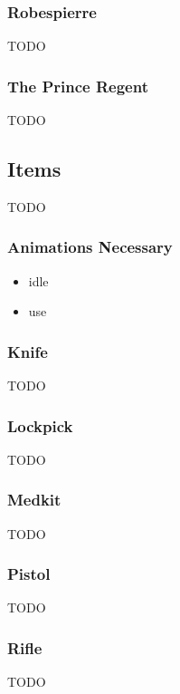 
\subsubsection{Robespierre}

TODO

\subsubsection{The Prince Regent}

TODO

\subsection{Items}

TODO

\subsubsection{Animations Necessary}

\begin{itemize}

\item idle
\item use

\end{itemize}

\subsubsection{Knife}

TODO

\subsubsection{Lockpick}

TODO

\subsubsection{Medkit}

TODO

\subsubsection{Pistol}

TODO

\subsubsection{Rifle}

TODO
